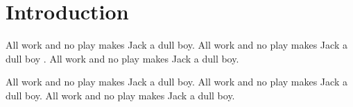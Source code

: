 
%
%

%
%

\section{Introduction}
\label{sec:introduction}

All work and no play makes Jack a dull boy.
All work and no play makes Jack a dull boy \cite{knuthwebsite}.
All work and no play makes Jack a dull boy.

All work and no play makes Jack a dull boy.
All work and no play makes Jack a dull boy.
All work and no play makes Jack a dull boy.
